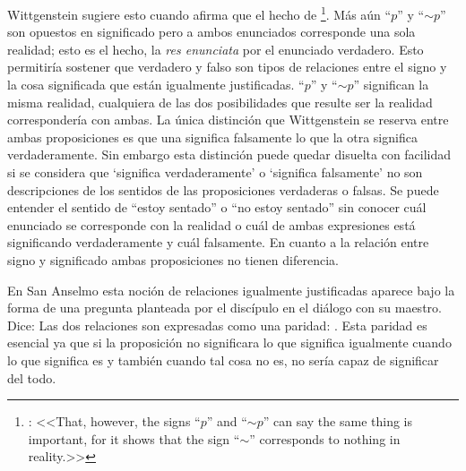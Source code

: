 Wittgenstein sugiere esto cuando afirma que el hecho de \footnote{\cite[\S4.0621]{wittgenstein1922tractatus}: <<That,
  however, the signs ``$p$'' and ``${\sim}p$'' can say the same thing is important,
  for it shows that the sign ``$\sim$'' corresponds to nothing in reality.>>}. Más
aún ``$p$'' y ``${\sim}p$'' son opuestos en significado pero a ambos enunciados
corresponde una sola realidad; esto es el hecho, la \emph{res enunciata} por el
enunciado verdadero. Esto permitiría sostener que verdadero y falso son tipos de
relaciones entre el signo y la cosa significada que están igualmente
justificadas. ``$p$'' y ``${\sim}p$'' significan la misma realidad, cualquiera
de las dos posibilidades que resulte ser la realidad correspondería con
ambas\autocite[Cf.~][73]{anscombe2011plato:truth}. La única distinción que
Wittgenstein se reserva entre ambas proposiciones es que una significa
falsamente lo que la otra significa verdaderamente. Sin embargo esta distinción
puede quedar disuelta con facilidad si se considera que `significa
verdaderamente' o `significa falsamente' no son descripciones de los sentidos de
las proposiciones verdaderas o falsas. Se puede entender el sentido de ``estoy
sentado'' o ``no estoy sentado'' sin conocer cuál enunciado se corresponde con
la realidad o cuál de ambas expresiones está significando verdaderamente y cuál
falsamente. En cuanto a la relación entre signo y significado ambas
proposiciones no tienen diferencia\autocite[Cf.~][74]{anscombe2011plato:truth}.

En San Anselmo esta noción de relaciones igualmente justificadas aparece bajo la
forma de una pregunta planteada por el discípulo en el diálogo con su maestro.
Dice:  Las dos
relaciones son expresadas como una paridad: \autocite[494]{anselm1952obras:deveritate}. Esta paridad es esencial ya
que si la proposición no significara lo que significa igualmente cuando lo que
significa es y también cuando tal cosa no es, no sería capaz de significar del
todo.

